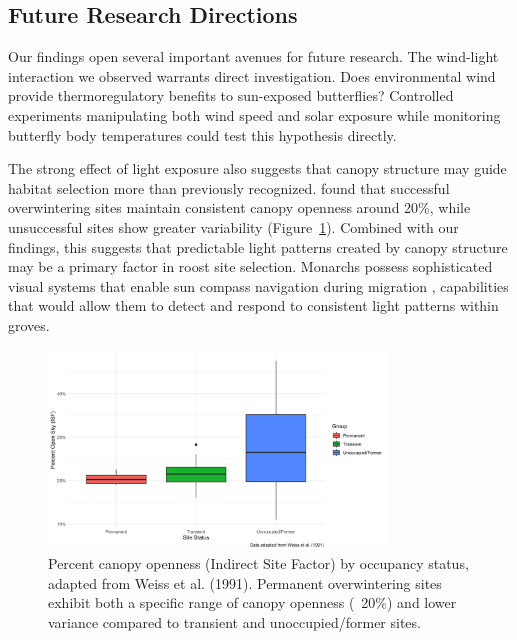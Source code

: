 \subsection{Future Research Directions}

Our findings open several important avenues for future research. The wind-light interaction we observed warrants direct investigation. Does environmental wind provide thermoregulatory benefits to sun-exposed butterflies? Controlled experiments manipulating both wind speed and solar exposure while monitoring butterfly body temperatures could test this hypothesis directly.

The strong effect of light exposure also suggests that canopy structure may guide habitat selection more than previously recognized. \textcite{weissForestCanopyStructure1991} found that successful overwintering sites maintain consistent canopy openness around 20\%, while unsuccessful sites show greater variability (Figure~\ref{fig:weiss_canopy}). Combined with our findings, this suggests that predictable light patterns created by canopy structure may be a primary factor in roost site selection. Monarchs possess sophisticated visual systems that enable sun compass navigation during migration \parencite{nguyenSunCompassNeurons2021,mouritsenVirtualMigrationTethered2002}, capabilities that would allow them to detect and respond to consistent light patterns within groves.

\begin{figure}[h]
    \centering
    \includegraphics[width=0.8\textwidth]{figures/discussion/weiss_adapted_boxplot.png}
    \caption{Percent canopy openness (Indirect Site Factor) by occupancy status, adapted from Weiss et al. (1991). Permanent overwintering sites exhibit both a specific range of canopy openness (~20\%) and lower variance compared to transient and unoccupied/former sites.}
    \label{fig:weiss_canopy}
\end{figure}

